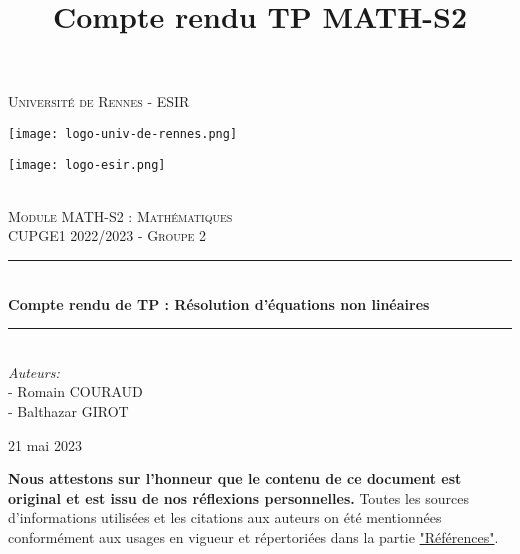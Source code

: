 \documentclass[12pt]{article}
\title{Compte rendu TP MATH-S2}
\newcommand{\HRule}{\rule{\linewidth}{0.5mm}}
\begin{document}
\pagestyle{plain}


\begin{titlepage}
\begin{center}

\textsc{\LARGE Université de Rennes - ESIR}\\[1cm]
\begin{minipage}{0.45\textwidth}
    \centering
    \texttt{[image: logo-univ-de-rennes.png]}
\end{minipage}\hfill
\begin{minipage}{0.45\textwidth}
    \centering
    \texttt{[image: logo-esir.png]}
\end{minipage}\\[3cm]

\textsc{\Large Module MATH-S2 : Mathématiques}\\[0.5cm]
\textsc{\large CUPGE1 2022/2023 - Groupe 2}\\[1cm]

\HRule\\[0.4cm]
{\huge \textbf{Compte rendu de TP : Résolution d'équations non linéaires}}\\[0.15cm]
\HRule\\[3cm]


{\large \emph{Auteurs:}\\
- Romain \textsc{COURAUD}\\
- Balthazar \textsc{GIROT}}

\vfill
21 mai 2023
\end{center}
\end{titlepage}
\restoregeometry
{}


\newpage
\thispagestyle{empty}
\setcounter{page}{0}

\tableofcontents

\vfill
\noindent
\textbf{Nous attestons sur l'honneur que le contenu de ce document est original et est issu de nos réflexions personnelles.} Toutes les sources d'informations utilisées et les citations aux auteurs on été mentionnées conformément aux usages en vigueur et répertoriées dans la partie \hyperref[ref:Références]{"Références"}.

\newpage
\end{document}
